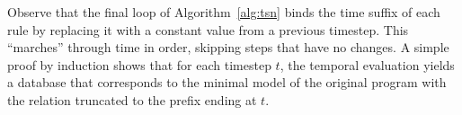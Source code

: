 Observe that the final loop of Algorithm~\ref{alg:tsn} binds the time suffix of each rule by replacing it with a constant value from a previous timestep.  This ``marches'' through time in order, skipping steps that have no changes.  A simple proof by induction shows that for each timestep $t$, the temporal evaluation yields a database that corresponds to the minimal model of the original \slang program with the  relation truncated to the prefix ending at $t$.
